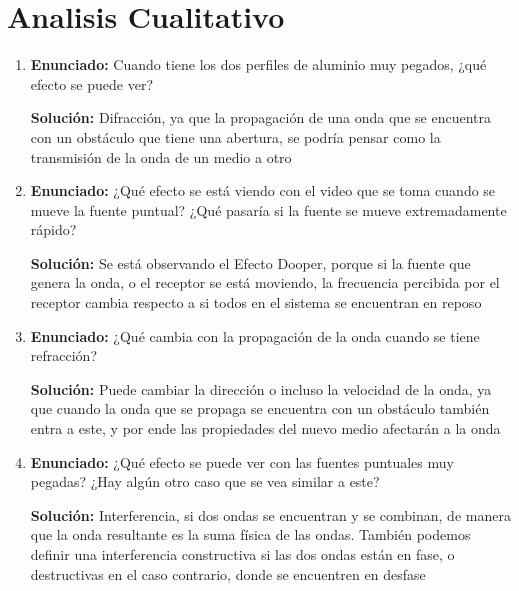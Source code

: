 \documentclass[a4paper, amsfonts, amssymb, amsmath, reprint, showkeys, nofootinbib, twoside]{revtex4-1}
\begin{document}
\section{Analisis Cualitativo}
\begin{enumerate}
  \item \textbf{Enunciado:} Cuando tiene los dos perfiles de aluminio muy pegados, ¿qué efecto se puede ver?

        \textbf{Solución:} Difracción, ya que la propagación de una onda que se encuentra con un obstáculo que tiene una abertura, se podría pensar como la transmisión de la onda de un medio a otro

  \item \textbf{Enunciado:} ¿Qué efecto se está viendo con el video que se toma cuando se mueve la fuente puntual? ¿Qué pasaría si la fuente se mueve extremadamente rápido?

        \textbf{Solución:} Se está observando el Efecto Dooper, porque si la fuente que genera la onda, o el receptor se está moviendo, la frecuencia percibida por el receptor cambia respecto a si todos en el sistema se encuentran en reposo

  \item \textbf{Enunciado:} ¿Qué cambia con la propagación de la onda cuando se tiene refracción?

        \textbf{Solución:} Puede cambiar la dirección o incluso la velocidad de la onda, ya que cuando la onda que se propaga se encuentra con un obstáculo también entra a este, y por ende las propiedades del nuevo medio afectarán a la onda

  \item \textbf{Enunciado:} ¿Qué efecto se puede ver con las fuentes puntuales muy pegadas? ¿Hay algún otro caso que se vea similar a este?

        \textbf{Solución:} Interferencia, si dos ondas se encuentran y se combinan, de manera que la onda resultante es la suma física de las ondas. También podemos definir una interferencia constructiva si las dos ondas están en fase, o destructivas en el caso contrario, donde se encuentren en desfase
\end{enumerate}
\end{document}
